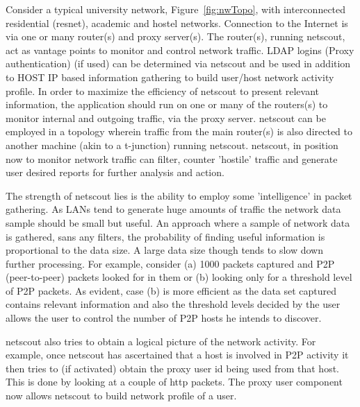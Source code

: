 \documentclass[twocolumn]{article}
\makeatletter
\def\section{\@startsection {section}{1}{\z@}{1.0ex plus 1ex minus .2ex}{.2ex plus .2ex}{\large\bf}}
\makeatother
\begin{document}
Consider a typical university network, Figure~\ref{fig:nwTopo}, with interconnected
residential (resnet), academic and hostel networks. Connection to the Internet is via
one or many router(s) and proxy server(s). The router(s), running netscout\cite{netscout}, act as vantage points to
monitor and control network traffic. LDAP logins (Proxy authentication) (if used) can be determined via
netscout and be used in addition to HOST IP based information gathering to build user/host network activity profile. 
In order to maximize the efficiency of netscout to present 
relevant information, the application should run on one or many of the routers(s) to 
monitor internal and outgoing traffic, via the proxy server. netscout can be employed in a 
topology wherein traffic from the main router(s) is also directed 
to another machine (akin to a t-junction) running netscout. netscout, in position now to 
monitor network traffic can filter, counter 'hostile' traffic and generate user desired 
reports for further analysis and action.

\section{the netscout advantage}
The strength of netscout lies is the ability to employ some 'intelligence' in packet gathering. As LANs
tend to generate huge amounts of traffic the network data sample should be small but useful. An approach where 
a sample of network data is gathered, sans any filters, the probability of finding useful information is
proportional to the data size. A large data size though tends to slow down further processing. For example,
consider (a) 1000 packets captured and P2P (peer-to-peer) packets looked for in them or (b) looking only for a threshold 
level of P2P packets. As evident, case (b) is more efficient as the data set captured contains relevant information 
and also the threshold levels decided by the user allows the user to control the number of P2P hosts he
intends to discover.  

netscout also tries to obtain a logical picture of the network activity. For example, once netscout has ascertained
that a host is involved in P2P activity it then tries to (if activated) obtain the proxy user id being used
from that host. This is done by looking at a couple of http packets. The proxy user component now
allows netscout to build network profile of a user. 
\end{document}
